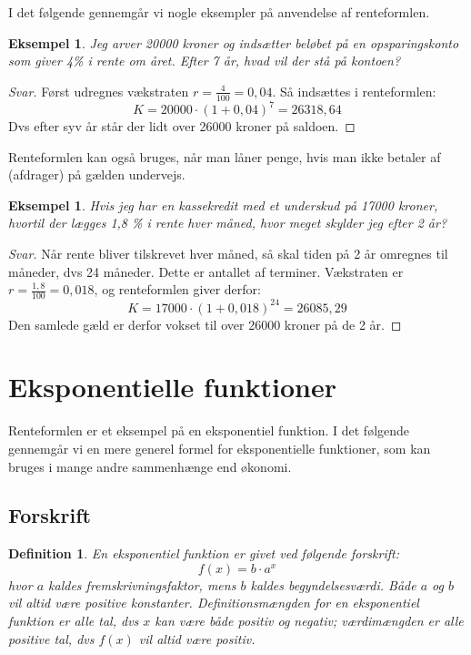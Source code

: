 \documentclass[12pt,oneside,a4paper]{article}
\newtheorem{mydef}[thm]{Definition}
\newtheorem{eks}[thm]{Eksempel}
\begin{document}
I det følgende gennemgår vi nogle eksempler på anvendelse af renteformlen.
\begin{eks}
    Jeg arver 20000 kroner og indsætter beløbet på en
    opsparingskonto som giver 4\% i rente om året. Efter 7 år, hvad vil der stå
    på kontoen?
\end{eks}
\begin{proof}[Svar]
    Først udregnes vækstraten $r=\frac{4}{100} = 0,04$. Så indsættes i renteformlen:
    $$
    K = 20000 \cdot (1 + 0,04)^7 = 26318,64
    $$
    Dvs efter syv år står der lidt over 26000 kroner på saldoen.
\end{proof}

Renteformlen kan også bruges, når man låner penge, hvis man ikke betaler af
(afdrager) på gælden undervejs.
\begin{eks}
    Hvis jeg har en kassekredit med et underskud på 17000 kroner, hvortil der
    lægges 1,8 \% i rente hver måned, hvor meget skylder jeg efter 2 år?
\end{eks}
\begin{proof}[Svar]
    Når rente bliver tilskrevet hver måned, så skal tiden på 2 år omregnes til
    måneder, dvs 24 måneder. Dette er antallet af terminer. Vækstraten er $r =
    \frac{1,8}{100} = 0,018$, og renteformlen giver derfor:
    $$
    K = 17000 \cdot (1 + 0,018)^{24} = 26085,29
    $$
    Den samlede gæld er derfor vokset til over 26000 kroner på de 2 år.
\end{proof}

\section{Eksponentielle funktioner}
Renteformlen er et eksempel på en eksponentiel funktion. I det følgende gennemgår vi en mere generel formel for eksponentielle funktioner, som kan bruges i mange andre sammenhænge end økonomi.

\subsection{Forskrift}
\begin{mydef}
    En eksponentiel funktion er givet ved følgende forskrift:
    $$
    f(x) = b\cdot a^x
    $$
    hvor $a$ kaldes {\em fremskrivningsfaktor},  mens $b$ kaldes {\em
    begyndelsesværdi}. Både $a$ og $b$ vil altid være positive konstanter.
    Definitionsmængden for en eksponentiel funktion er alle tal, dvs $x$ kan
    være både positiv og negativ; værdimængden er alle positive tal, dvs
    $f(x)$ vil altid være positiv.
\end{mydef}
\end{document}
